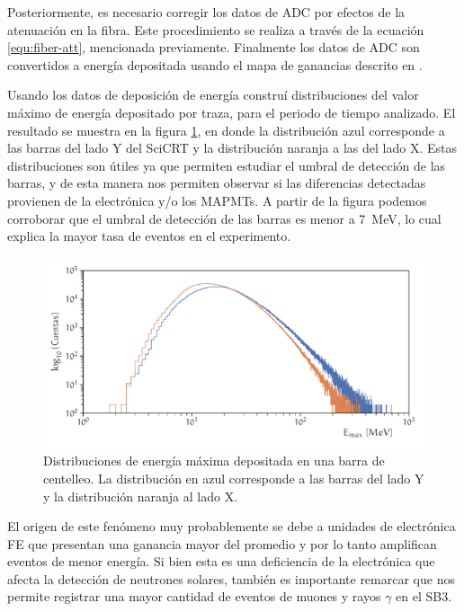 Posteriormente, es necesario corregir los datos de ADC por efectos de la atenuación en la fibra. Este procedimiento se realiza a través de la ecuación \ref{equ:fiber-att}, mencionada previamente. Finalmente los datos de ADC son convertidos a energía depositada usando el mapa de ganancias descrito en \cite{hikimochi16}.

Usando los datos de deposición de energía construí distribuciones del valor máximo de energía depositado por traza, para el periodo de tiempo analizado. El resultado se muestra en la figura \ref{fig:neutron-mindep}, en donde la distribución azul corresponde a las barras del lado Y del SciCRT y la distribución naranja a las del lado X. Estas distribuciones son útiles ya que permiten estudiar el umbral de detección de las barras, y de esta manera nos permiten observar si las diferencias detectadas provienen de la electrónica y/o los MAPMTs. A partir de la figura podemos corroborar que el umbral de detección de las barras es menor a \SI{7}{\mega\electronvolt}, lo cual explica la mayor tasa de eventos en el experimento.

\begin{figure}
        \centering
        \includegraphics[width=\textwidth]{neutron-mindep.pdf}
        \caption{Distribuciones de energía máxima depositada en una barra de centelleo. La distribución en azul corresponde a las barras del lado Y y la distribución naranja al lado X.}
        \label{fig:neutron-mindep}
\end{figure}

El origen de este fenómeno muy probablemente se debe a unidades de electrónica FE que presentan una ganancia mayor del promedio y por lo tanto amplifican eventos de menor energía. Si bien esta es una deficiencia de la electrónica que afecta la detección de neutrones solares, también es importante remarcar que nos permite registrar una mayor cantidad de eventos de muones y rayos $\gamma$ en el SB3.



